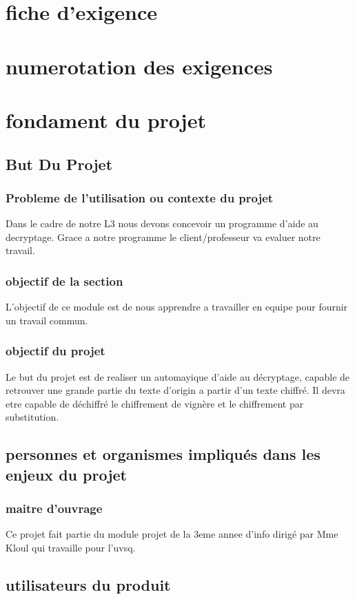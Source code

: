 \documentclass[a4]{article}
\begin{document}
		\section{fiche d'exigence}
		\section{numerotation des exigences}
		
	\section{fondament du projet}
		\subsection{But Du Projet} 
			\subsubsection{Probleme de l'utilisation ou contexte du projet}
				Dans le cadre de notre L3 nous devons concevoir un programme d'aide au decryptage.
				Grace a notre programme le client/professeur va evaluer notre travail.
			\subsubsection{objectif de la section}
				L'objectif de ce module est de nous apprendre a travailler en equipe pour fournir un travail commun.
			\subsubsection{objectif du projet}
				Le but du projet est de realiser un automayique d'aide au décryptage, capable de retrouver une grande partie du texte d'origin a partir d'un texte chiffré. Il devra etre capable de déchiffré le chiffrement de vignère et le chiffrement par substitution.
		\subsection{personnes et organismes impliqués dans les enjeux du projet} 
			\subsubsection{maitre d'ouvrage}
				Ce projet fait partie du module projet de la 3eme annee d'info dirigé par Mme Kloul qui travaille pour l'uvsq.			
		\subsection{utilisateurs du produit}
			
\end{document}
